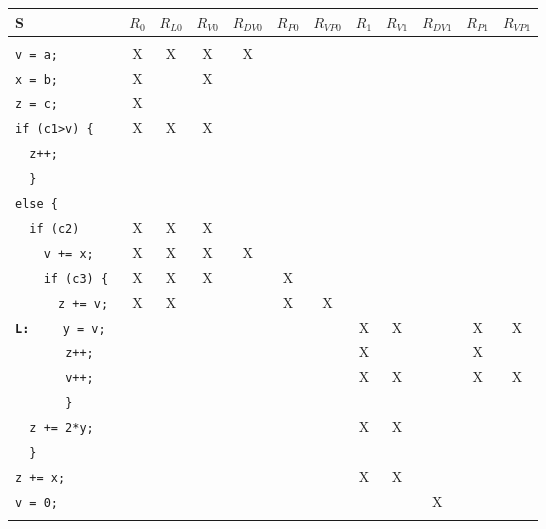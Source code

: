 \begin{center}
\begin{scriptsize}
\begin{tabular}{|l||c|c|c|c|c|c||c|c|c|c|c| }
\hline
S & $R_{0}$ & $R_{L0}$ & $R_{V0}$ & $R_{DV0}$ & $R_{P0}$ & $R_{VP0}$
            & $R_{1}$ & $R_{V1}$ & $R_{DV1}$ & $R_{P1}$ & $R_{VP1}$ \\
\hline
\verb!!                      &   &   &   &   &   &   &   &   &   &   &  \\
\verb!v = a; !               & X & X & X & X &   &   &   &   &   &   &  \\
\verb!x = b; !               & X &   & X &   &   &   &   &   &   &   &  \\
\verb!z = c; !               & X &   &   &   &   &   &   &   &   &   &  \\
\verb!if (c1>v) { !          & X & X & X &   &   &   &   &   &   &   &  \\
\verb!  z++;    !            &   &   &   &   &   &   &   &   &   &   &  \\
\verb!  }       !            &   &   &   &   &   &   &   &   &   &   &  \\
\verb!else {    !            &   &   &   &   &   &   &   &   &   &   &  \\
\verb!  if (c2) !            & X & X & X &   &   &   &   &   &   &   &  \\
\verb!    v += x; !          & X & X & X & X &   &   &   &   &   &   &  \\
\verb!    if (c3) { !        & X & X & X &   & X &   &   &   &   &   &  \\
\verb!      z += v; !        & X & X &   &   & X & X &   &   &   &   &  \\
\hline
{\tt\bf L:}
  \verb!    y = v; !         &   &   &   &   &   &   & X & X &   & X & X \\
\verb!       z++;   !        &   &   &   &   &   &   & X &   &   & X &   \\
\verb!       v++; !          &   &   &   &   &   &   & X & X &   & X & X \\
\verb!       } !             &   &   &   &   &   &   &   &   &   &   &   \\
\verb!  z += 2*y; !          &   &   &   &   &   &   & X & X &   &   &   \\
\verb!  }      !             &   &   &   &   &   &   &   &   &   &   &   \\
\verb!z += x;  !             &   &   &   &   &   &   & X & X &   &   &   \\
\verb!v = 0; !               &   &   &   &   &   &   &   &   & X &   &   \\
\verb!!                      &   &   &   &   &   &   &   &   &   &   &   \\
\hline
\end{tabular}\end{scriptsize}\end{center}
\begin{exemple2}
\end{exemple2}

